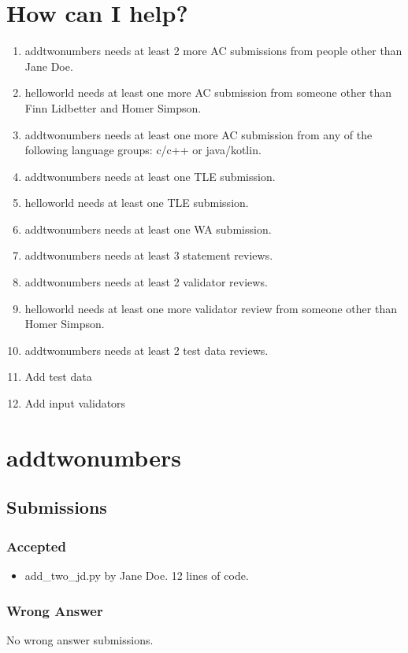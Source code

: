 \documentclass{article}%
\begin{document}
\section{How can I help?}%
\label{sec:HowcanIhelp?}%
\begin{enumerate}%
\item%
addtwonumbers needs at least 2 more AC submissions from people other than Jane Doe.%
\item%
helloworld needs at least one more AC submission from someone other than Finn Lidbetter and Homer Simpson.%
\item%
addtwonumbers needs at least one more AC submission from any of the following language groups: c/c++ or java/kotlin.%
\item%
addtwonumbers needs at least one TLE submission.%
\item%
helloworld needs at least one TLE submission.%
\item%
addtwonumbers needs at least one WA submission.%
\item%
addtwonumbers needs at least 3 statement reviews.%
\item%
addtwonumbers needs at least 2 validator reviews.%
\item%
helloworld needs at least one more validator review from someone other than Homer Simpson.%
\item%
addtwonumbers needs at least 2 test data reviews.%
\item%
Add test data%
\item%
Add input validators%
\end{enumerate}

%
\newpage%
\section{addtwonumbers}%
\label{sec:addtwonumbers}%
\subsection{Submissions}%
\label{subsec:Submissions}%
\subsubsection{Accepted}%
\label{ssubsec:Accepted}%
\begin{itemize}%
\item%
add\_two\_jd.py by Jane Doe. 12 lines of code.%
\end{itemize}

%
\subsubsection{Wrong Answer}%
\label{ssubsec:WrongAnswer}%
No wrong answer submissions.%
\end{document}
